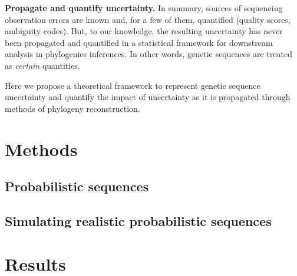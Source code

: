 \documentclass[10pt]{article}
\begin{document}
\textbf{Propagate and quantify uncertainty.}
In summary, sources of sequencing observation errors are known and, for a few of them, quantified (quality scores, ambiguity codes).
But, to our knowledge, the resulting uncertainty has never been propagated and quantified in a statistical framework for downstream analysis in  phylogenies inferences.
In other words, genetic sequences are treated as \emph{certain} quantities.

Here we propose a theoretical framework to represent genetic sequence uncertainty and quantify the impact of uncertainty as it is propagated through methods of phylogeny reconstruction. 

\section{Methods}

\subsection{Probabilistic sequences}

\subsection{Simulating realistic probabilistic sequences}


\section{Results}
\end{document}
